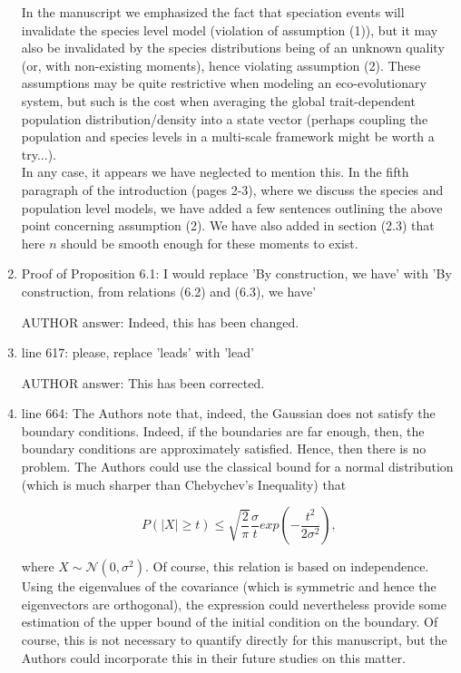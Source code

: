 \documentclass[a4paper,11pt]{scrartcl}
\begin{document}
\begin{enumerate}
In the manuscript we emphasized the fact that speciation events will invalidate the species level model (violation of assumption (1)), but it may also be invalidated by the species distributions being of an unknown quality (or, with non-existing moments), hence violating assumption (2). These assumptions may be quite restrictive when modeling an eco-evolutionary system, but such is the cost when averaging the global trait-dependent population distribution/density into a state vector (perhaps coupling the population and species levels in a multi-scale framework might be worth a try...).  \\

In any case, it appears we have neglected to mention this. In the fifth paragraph of the introduction (pages 2-3), where we discuss the species and population level models, we have added a few sentences outlining the above point concerning assumption (2). We have also added in section (2.3) that here $n$ should be smooth enough for these moments to exist.\\
     

\item
Proof of Proposition 6.1: I would replace 'By construction, we have' with 'By construction, from relations (6.2) and (6.3), we have'

AUTHOR answer: Indeed, this has been changed.

\item
line 617: please, replace 'leads' with 'lead'

AUTHOR answer: This has been corrected.

\item
line 664: The Authors note that, indeed, the Gaussian does not satisfy the boundary conditions. Indeed, if the boundaries are far enough, then, the boundary conditions are approximately satisfied. Hence, then there is no problem. The Authors could use the classical bound for a normal distribution (which is much sharper than Chebychev's Inequality) that

$$P(|X| \ge t ) \le \sqrt{\frac{2}{\pi}} \frac{\sigma}{t} exp(-\frac{t^2}{2 \sigma^2}),$$

where $X \sim \mathcal{N}(0,\sigma^2)$. Of course, this relation is based on independence. Using the eigenvalues of the covariance (which is symmetric and hence the eigenvectors are orthogonal), the expression could nevertheless provide some estimation of the upper bound of the initial condition on the boundary.
Of course, this is not necessary to quantify directly for this manuscript, but the Authors could incorporate this in their future studies on this matter.


\end{enumerate}
\end{document}
